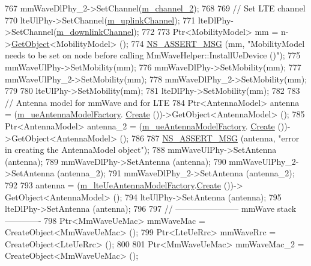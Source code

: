 \begin{DoxyCode}
767    mmWaveDlPhy\_2->SetChannel(\hyperlink{classns3_1_1MmWaveHelper_af0230ef91f1c4defe2a316f5de3ff209}{m\_channel\_2});
768 
769         \textcolor{comment}{// Set LTE channel}
770         lteUlPhy->SetChannel(\hyperlink{classns3_1_1MmWaveHelper_a4f2b3aa855c0324fadfd5b174e240a66}{m\_uplinkChannel});
771         lteDlPhy->SetChannel(\hyperlink{classns3_1_1MmWaveHelper_aa8d0ffe634d74e461d22d96afcec0239}{m\_downlinkChannel});
772 
773         Ptr<MobilityModel> mm = n->\hyperlink{classns3_1_1Object_a13e18c00017096c8381eb651d5bd0783}{GetObject}<MobilityModel> ();
774         \hyperlink{assert_8h_aff5ece9066c74e681e74999856f08539}{NS\_ASSERT\_MSG} (mm, \textcolor{stringliteral}{"MobilityModel needs to be set on node before calling
       MmWaveHelper::InstallUeDevice ()"});
775         mmWaveUlPhy->SetMobility(mm);
776         mmWaveDlPhy->SetMobility(mm);
777   mmWaveUlPhy\_2->SetMobility(mm);
778         mmWaveDlPhy\_2->SetMobility(mm);
779 
780         lteUlPhy->SetMobility(mm);
781         lteDlPhy->SetMobility(mm);
782 
783         \textcolor{comment}{// Antenna model for mmWave and for LTE}
784         Ptr<AntennaModel> antenna = (\hyperlink{classns3_1_1MmWaveHelper_a8b7460b8578a56bb15f191983959b3ac}{m\_ueAntennaModelFactory}.
      \hyperlink{classns3_1_1ObjectFactory_a18152e93f0a6fe184ed7300cb31e9896}{Create} ())->GetObject<AntennaModel> ();
785         Ptr<AntennaModel> antenna\_2 = (\hyperlink{classns3_1_1MmWaveHelper_a8b7460b8578a56bb15f191983959b3ac}{m\_ueAntennaModelFactory}.
      \hyperlink{classns3_1_1ObjectFactory_a18152e93f0a6fe184ed7300cb31e9896}{Create} ())->GetObject<AntennaModel> ();
786 
787         \hyperlink{assert_8h_aff5ece9066c74e681e74999856f08539}{NS\_ASSERT\_MSG} (antenna, \textcolor{stringliteral}{"error in creating the AntennaModel object"});
788         mmWaveUlPhy->SetAntenna (antenna);
789         mmWaveDlPhy->SetAntenna (antenna);
790         mmWaveUlPhy\_2->SetAntenna (antenna\_2);
791         mmWaveDlPhy\_2->SetAntenna (antenna\_2);
792 
793         antenna = (\hyperlink{classns3_1_1MmWaveHelper_a543a845c12b4efc740350488d5eb6814}{m\_lteUeAntennaModelFactory}.\hyperlink{classns3_1_1ObjectFactory_a18152e93f0a6fe184ed7300cb31e9896}{Create} ())->
      GetObject<AntennaModel> ();
794         lteUlPhy->SetAntenna (antenna);
795         lteDlPhy->SetAntenna (antenna);
796 
797         \textcolor{comment}{// ----------------------- mmWave stack -------------}
798         Ptr<MmWaveUeMac> mmWaveMac = CreateObject<MmWaveUeMac> ();
799         Ptr<LteUeRrc> mmWaveRrc = CreateObject<LteUeRrc> ();
800 
801         Ptr<MmWaveUeMac> mmWaveMac\_2 = CreateObject<MmWaveUeMac> ();

\end{DoxyCode}
